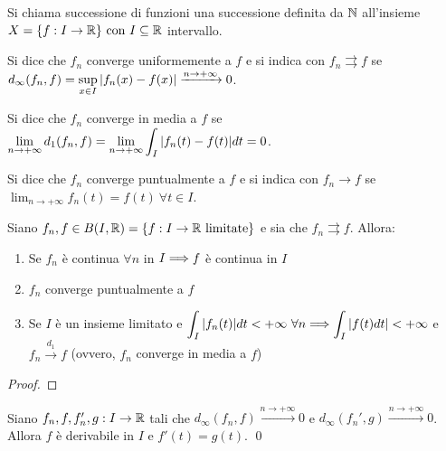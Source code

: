\begin{definition}
    Si chiama successione di funzioni una successione definita da $\mathbb{N}$ all'insieme $X=\{f: I \to \mathbb{R}\} \text{ con } I \subseteq \mathbb{R}$ intervallo.
\end{definition}

\begin{definition}
    Si dice che $f_n$ converge uniformemente a $f$ e si indica con $f_n \rightrightarrows f$ se $d_\infty(f_n, f) = \sup\limits_{x \in I}\abs{f_n(x) - f(x)} \xrightarrow{n \to + \infty} 0$.
\end{definition}

\begin{definition}
    Si dice che $f_n$ converge in media a $f$ se $\displaystyle \lim_{n\to + \infty}d_1(f_n,f)=\lim_{n \to + \infty} \int_I\abs{f_n(t) - f(t)}dt = 0$.
\end{definition}

\begin{definition}
    Si dice che $f_n$ converge puntualmente a $f$ e si indica con $f_n \to f$ se $\displaystyle \lim_{n\to +\infty} f_n(t) = f(t) \ \forall t \in I$.
\end{definition}

\begin{theorem}
    Siano $f_n, f \in B(I, \mathbb{R}) = \{f: I \to \mathbb{R} \text{ limitate}\}$ e sia che $f_n \rightrightarrows f$. Allora:
    \begin{enumerate}
        \item Se $f_n$ è continua $\forall n$ in $I \Longrightarrow f$ è continua in $I$
        \item $f_n$ converge puntualmente a $f$
        \item Se $I$ è un insieme limitato e $\displaystyle \int_I\abs{f_n(t)}dt < + \infty \ \forall n \Longrightarrow \int_I\abs{f(t)dt} < +\infty$ e $f_n \xrightarrow{d_1} f$ (ovvero, $f_n$ converge in media a $f$)
    \end{enumerate}
\end{theorem}

\begin{proof}
\end{proof}

\begin{theorem}
    Siano $f_n, f, f_n', g: I \to \mathbb{R}$ tali che $d_\infty(f_n, f) \xrightarrow{n\to + \infty} 0$ e $d_\infty(f_n', g) \xrightarrow{n \to +\infty} 0$. Allora $f$ è derivabile in $I$ e $f'(t) = g(t)$. \qed
\end{theorem}